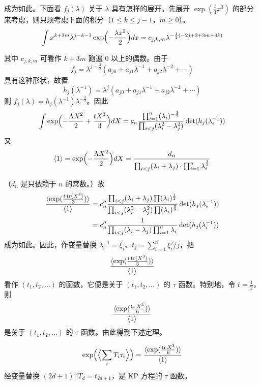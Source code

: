 
成为如此。下面看 $f_j(\lambda)$ 关于 $\lambda$ 具有怎样的展开。先展开 $\exp(\frac{t}{3}x^3)$ 的部分来考虑，则只须考虑下面的积分（$1\le k\le j-1$，$m\ge0$）。
\[
\int x^{k+3m}\lambda^{j-k-1}\exp\Bigl(-\frac{\lambda x^2}{2}\Bigr)dx
=c_{j,k,m}\lambda^{-\frac{1}{2}(-2j+3+3m+3k)}
\]

其中 $c_{j,k,m}$ 可看作 $k+3m$ 跑遍 $0$ 以上的偶数。由于
\[
f_j=\lambda^{j-\frac{3}{2}}(a_{j0}+a_{j1}\lambda^{-1}+a_{j2}\lambda^{-2}+\cdots)
\]
具有这种形状，故置
\[
h_j(\lambda^{-1})=\lambda^j(a_{j0}+a_{j1}\lambda^{-1}+a_{j2}\lambda^{-2}+\cdots)
\]
则 $f_j(\lambda)=h_j(\lambda^{-1})\lambda^{-\frac{3}{2}}$。因此
\[
\int\exp\Bigl(-\frac{\Lambda X^2}{2}+\frac{tX^3}{3}\Bigr)dX
=c_n\frac{\prod_{i=1}^n(\lambda_i)^{-\frac{3}{2}}}{\prod_{i<j}(\lambda_i^2-\lambda_j^2)}
\det(h_j(\lambda_i^{-1}))
\]
又
\[
\langle1\rangle=\exp\Bigl(-\frac{\Lambda X^2}{2}\Bigr)dX
=\frac{d_n}{\prod_{i<j}(\lambda_i+\lambda_j)\cdot\prod_{i=1}^n\lambda_i^{\frac{1}{2}}}
\]


（$d_n$ 是只依赖于 $n$ 的常数。）故
\[
\begin{aligned}
\frac{\langle\exp(\frac{t\operatorname{tr}(X^3)}{3})\rangle}{\langle1\rangle}
&=c_n''\frac{\prod_{i<j}(\lambda_i+\lambda_j)\prod(\lambda_i)^{\frac{1}{2}}}
{\prod_{i<j}(\lambda_i^2-\lambda_j^2)\prod(\lambda_i)^{\frac{3}{2}}}\det(h_j(\lambda_i^{-1}))\\
&=c_n''\frac{1}{\prod_{i<j}(\lambda_i-\lambda_j)\prod_{i=1}^n\lambda_i}\det(h_j(\lambda_i^{-1}))
\end{aligned}
\]
成为如此。因此，作变量替换 $\lambda_i^{-1}=\xi_i$、$t_j=\sum_{i=1}^n\xi_i^j/j$，把
\[
\frac{\langle\exp(\frac{t\operatorname{tr}(X^3)}{3})\rangle}{\langle1\rangle}
\]
看作 $(t_1,t_2,\dots)$ 的函数，它便是关于 $(t_1,t_2,\dots)$ 的 $\tau$ 函数。特别地，令 $t=\frac{1}{2}$，则
\[
\frac{\langle\exp(\frac{\operatorname{tr} X^3}{6})\rangle}{\langle1\rangle}
\]
是关于 $(t_1,t_2,\dots)$ 的 $\tau$ 函数。由此得到下述定理。

\begin{theorem}
\[
\exp\Bigl(\Bigl\langle\sum_i T_i\tau_i\Bigr\rangle\Bigr)
=\frac{\langle\exp(\frac{\operatorname{tr} X^3}{6})\rangle}{\langle1\rangle}
\]
经变量替换 $(2d+1)!!T_d=t_{2d+1}$，是 KP 方程的 $\tau$ 函数。
\end{theorem}

